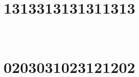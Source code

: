 \section{1313313131311313}

\marginnote[3\baselineskip]{\centering}



\,
\newline
\vspace{1.2cm}

\section{0203031023121202}

\marginnote[3\baselineskip]{\centering}



\,
\newline
\vspace{1.2cm}
